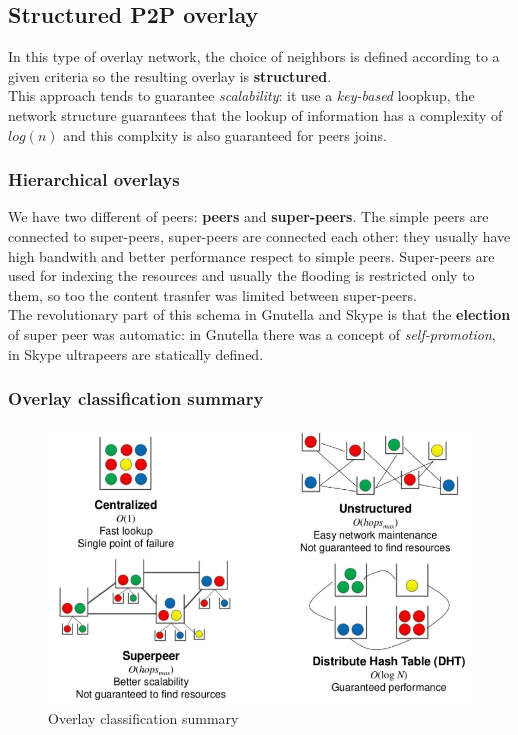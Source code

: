 \documentclass[10pt,a4paper]{report}
\begin{document}
\subsection{Structured P2P overlay}\label{sec:structured-p2p-overlay-intro}
In this type of overlay network, the choice of neighbors is defined according to a given criteria so the resulting overlay is \textbf{structured}.\\
This approach tends to guarantee \textit{scalability}: it use a \textit{key-based} loopkup, the network structure guarantees that the lookup of information has a complexity of $log(n)$ and this complxity is also guaranteed for peers joins.
\subsubsection{Hierarchical overlays}\label{sec:hierarchical-overlays}
We have two different of peers: \textbf{peers} and \textbf{super-peers}. The simple peers are connected to super-peers, super-peers are connected each other: they usually have high bandwith and better performance respect to simple peers. Super-peers are used for indexing the resources and usually the flooding is restricted only to them, so too the content trasnfer was limited between super-peers.\\
The revolutionary part of this schema in Gnutella and Skype is that the \textbf{election} of super peer was automatic: in Gnutella there was a concept of \textit{self-promotion}, in Skype ultrapeers are statically defined.

\subsubsection{Overlay classification summary}
\label{sec:overlay-classification-summary}
\begin{figure}[h!]
	\centering
	\includegraphics[scale=0.50]{images/Pasted image 20230301115346.png}
	\caption{Overlay classification summary}
	\label{overlay-summary}
\end{figure}
\end{document}
